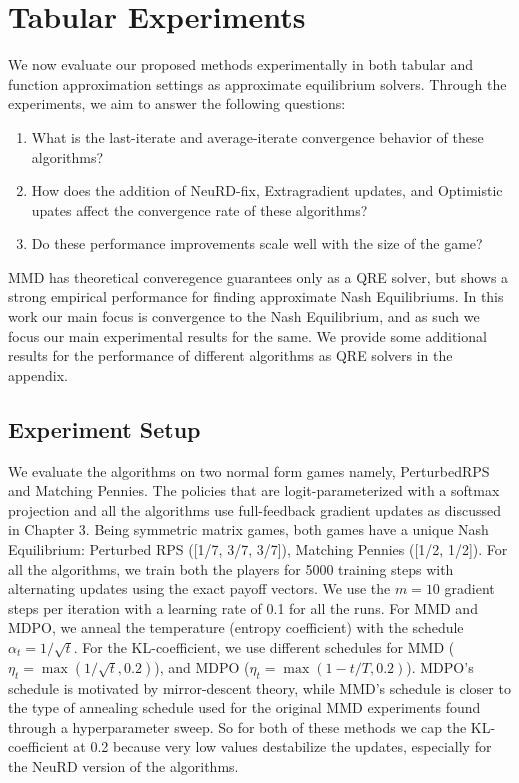 \chapter{Tabular Experiments}

We now evaluate our proposed methods experimentally in both tabular and function approximation
settings as approximate equilibrium solvers.
Through the experiments, we aim to answer the following questions:
\begin{enumerate}
	\item {What is
	      the last-iterate and average-iterate convergence behavior of these algorithms?
	      }\label{qn1}
	\item {How does the addition of NeuRD-fix, Extragradient updates, and Optimistic upates
	      affect the convergence rate of these algorithms?}\label{qn2}
	\item {Do these performance improvements scale well with the size of the game?}\label{qn3}
\end{enumerate}

MMD has theoretical converegence guarantees only as a QRE solver, but shows a strong empirical
performance for finding approximate Nash Equilibriums.
In this work our main focus is convergence to the Nash Equilibrium, and as such we focus our main
experimental results for the same.
We provide some additional results for the performance of different algorithms as QRE solvers in
the appendix.

\section{Experiment Setup}
We evaluate the algorithms on two normal form games namely, PerturbedRPS and Matching Pennies.
The policies that are logit-parameterized with a softmax projection and all the algorithms use
full-feedback gradient updates as discussed in Chapter 3.
Being symmetric matrix games, both games have a unique Nash Equilibrium: Perturbed RPS ([1/7, 3/7,
		3/7]), Matching Pennies ([1/2, 1/2]).
For all the algorithms, we train both the players for 5000 training steps with alternating updates
using the exact payoff vectors.
We use the $m=10$ gradient steps per iteration with a learning rate of 0.1 for all the runs.
For MMD and MDPO, we anneal the temperature (entropy coefficient) with the schedule $\alpha_t =
	1/\sqrt{t}$.
For the KL-coefficient, we use different schedules for MMD ($\eta_t = \max(1 / \sqrt{t}, 0.2)$),
and MDPO ($\eta_t = \max(1 - t/T, 0.2)$).
MDPO's schedule is motivated by mirror-descent theory, while MMD's schedule is closer to the type
of annealing schedule used for the original MMD experiments found through a hyperparameter sweep.
So for both of these methods we cap the KL-coefficient at 0.2 because very low values destabilize
the updates, especially for the NeuRD version of the algorithms.

